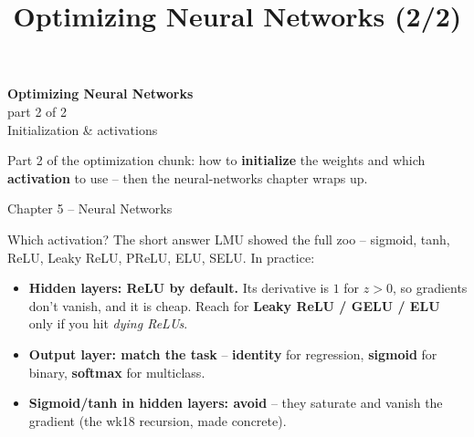 \documentclass[aspectratio=43]{beamer}
\title{Optimizing Neural Networks (2/2)}
\date{}
\begin{document}
\begin{frame}[plain]
  \vfill
  \begin{center}
    {\Large\color{popblue}\textbf{Optimizing Neural Networks}}\\[0.3em]
    {\normalsize\color{gray} part 2 of 2}\\[0.4em]
    {\large Initialization \& activations}\\[1.0em]
    \begin{minipage}{0.86\textwidth}\centering\small
      Part 2 of the optimization chunk: how to \textbf{initialize} the weights and which
      \textbf{activation} to use -- then the neural-networks chapter wraps up.
    \end{minipage}
  \end{center}
  \vfill
  {\footnotesize\color{gray} Chapter 5 -- Neural Networks}
\end{frame}





\begin{frame}{Which activation? The short answer}
  LMU showed the full zoo -- sigmoid, tanh, ReLU, Leaky ReLU, PReLU, ELU, SELU. In practice:
  \vfill
  \begin{itemize}\small
    \item \textbf{Hidden layers: ReLU by default.} Its derivative is $1$ for $z>0$, so gradients
      don't vanish, and it is cheap. Reach for \textbf{Leaky ReLU / GELU / ELU} only if you hit
      \emph{dying ReLUs}.
    \item \textbf{Output layer: match the task} -- \textbf{identity} for regression,
      \textbf{sigmoid} for binary, \textbf{softmax} for multiclass.
    \item \textbf{Sigmoid/tanh in hidden layers: avoid} -- they saturate and vanish the gradient
      (the wk18 recursion, made concrete).
  \end{itemize}
  \vfill
\end{frame}
\end{document}
